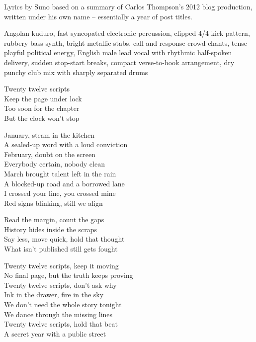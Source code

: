
\begin{notes}
Lyrics by Suno based on a summary of Carlos Thompson's 2012 blog production, written under his own name -- essentially a year of post titles.
\end{notes}
\begin{style}
Angolan kuduro, fast syncopated electronic percussion, clipped 4/4 kick pattern, rubbery bass synth, bright metallic stabs, call-and-response crowd chants, tense playful political energy, English male lead vocal with rhythmic half-spoken delivery, sudden stop-start breaks, compact verse-to-hook arrangement, dry punchy club mix with sharply separated drums
\end{style}
\begin{lyrics}
Twenty twelve scripts\\
Keep the page under lock\\
Too soon for the chapter\\
But the clock won't stop

January, steam in the kitchen\\
A sealed-up word with a loud conviction\\
February, doubt on the screen\\
Everybody certain, nobody clean\\
March brought talent left in the rain\\
A blocked-up road and a borrowed lane\\
I crossed your line, you crossed mine\\
Red signs blinking, still we align

Read the margin, count the gaps\\
History hides inside the scraps\\
Say less, move quick, hold that thought\\
What isn't published still gets fought

Twenty twelve scripts, keep it moving\\
No final page, but the truth keeps proving\\
Twenty twelve scripts, don't ask why\\
Ink in the drawer, fire in the sky\\
We don't need the whole story tonight\\
We dance through the missing lines\\
Twenty twelve scripts, hold that beat\\
A secret year with a public street


\end{lyrics}
